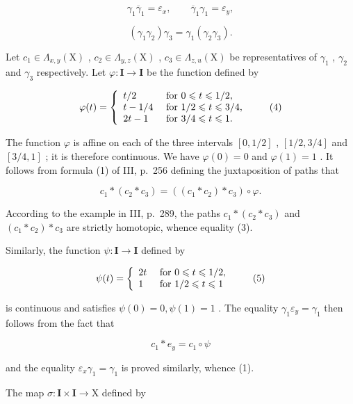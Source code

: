 \[
\gamma_ {1} \overline {{\gamma}} _ {1} = \varepsilon_ {x}, \qquad \overline {{\gamma}} _ {1} \gamma_ {1} = \varepsilon_ {y},\tag{3}
\]

\[
(\gamma_ {1} \gamma_ {2}) \gamma_ {3} = \gamma_ {1} (\gamma_ {2} \gamma_ {3}).
\]

Let \(c_{1} \in \Lambda_{x,y}(\mathrm{X})\) , \(c_{2} \in \Lambda_{y,z}(\mathrm{X})\) , \(c_{3} \in \Lambda_{z,u}(\mathrm{X})\) be representatives of \(\gamma_{1}\) , \(\gamma_{2}\) and \(\gamma_{3}\) respectively. Let \(\varphi: \mathbf{I} \to \mathbf{I}\) be the function defined by

\[
\varphi (t) = \left\{ \begin{array}{l l} t / 2 & \text { for } 0 \leqslant t \leqslant 1 / 2, \\ t - 1 / 4 & \text { for } 1 / 2 \leqslant t \leqslant 3 / 4, \\ 2 t - 1 & \text { for } 3 / 4 \leqslant t \leqslant 1. \end{array} \right.\tag{4}
\]

The function \(\varphi\) is affine on each of the three intervals \([0,1/2]\) , \([1/2,3/4]\) and \([3/4,1]\) ; it is therefore continuous. We have \(\varphi(0) = 0\) and \(\varphi(1) = 1\) . It follows from formula (1) of III, p.~256 defining the juxtaposition of paths that

\[
c _ {1} * (c _ {2} * c _ {3}) = ((c _ {1} * c _ {2}) * c _ {3}) \circ \varphi .
\]

According to the example in III, p.~289, the paths \(c_{1} * (c_{2} * c_{3})\) and \((c_{1} * c_{2}) * c_{3}\) are strictly homotopic, whence equality (3).

Similarly, the function \(\psi\colon\mathbf{I}\to\mathbf{I}\) defined by

\[
\psi (t) = \left\{ \begin{array}{l l} 2 t & \text { for } 0 \leqslant t \leqslant 1 / 2, \\ 1 & \text { for } 1 / 2 \leqslant t \leqslant 1 \end{array} \right.\tag{5}
\]

is continuous and satisfies \(\psi(0)=0,\psi(1)=1\) . The equality \(\gamma_{1}\varepsilon_{y}=\gamma_{1}\) then follows from the fact that

\[
c _ {1} * e _ {y} = c _ {1} \circ \psi
\]

and the equality \(\varepsilon_{x}\gamma_{1}=\gamma_{1}\) is proved similarly, whence (1).

The map \(\sigma\colon\mathbf{I}\times\mathbf{I}\to\mathrm{X}\) defined by

